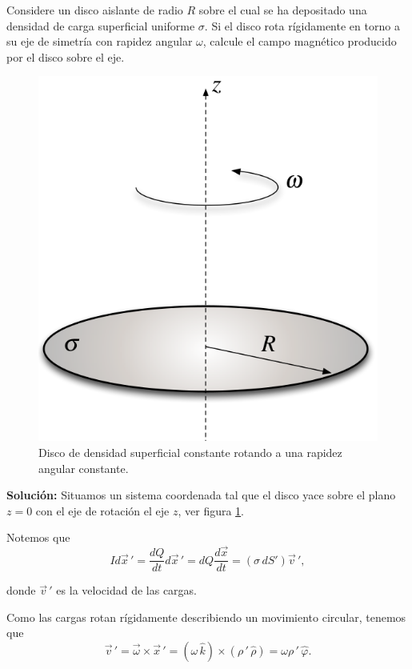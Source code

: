 \begin{ejemplo}
     Considere un disco aislante de radio $R$ sobre el cual se ha depositado una densidad de carga superficial uniforme $\sigma$. Si el disco rota rígidamente en torno a su eje de simetría con rapidez angular $\omega$, calcule el campo magnético producido por el disco sobre el eje.

\begin{figure}[H]
    \centering
    \includegraphics[scale = 0.3]{Figuras/CampoMagneticoDiscoRotando.png}
    \caption{Disco de densidad superficial constante rotando a una rapidez angular constante.}
    \label{fig:Disco-Rotando}
\end{figure}

\textbf{Solución:} Situamos un sistema coordenada tal que el disco yace sobre el plano $z =0$ con el eje de rotación el eje $z$, ver figura \ref{fig:Disco-Rotando}.

Notemos que
$$I d\Vec{x}\,' = \frac{dQ}{dt} d\Vec{x}\,' = dQ \frac{d\Vec{x}}{dt} = (\sigma \,dS') \Vec{v}\,',$$

donde $\vec{v}\,'$ es la velocidad de las cargas.

Como las cargas rotan rígidamente describiendo un movimiento circular, tenemos que
$$\Vec{v}\,' = \vec{\omega} \times \vec{x}\,' = (\omega \,\hat{k}) \times (\rho\,' \,\hat{\rho}) = \omega \rho\,' \,\hat{\varphi}.$$


\end{ejemplo}
